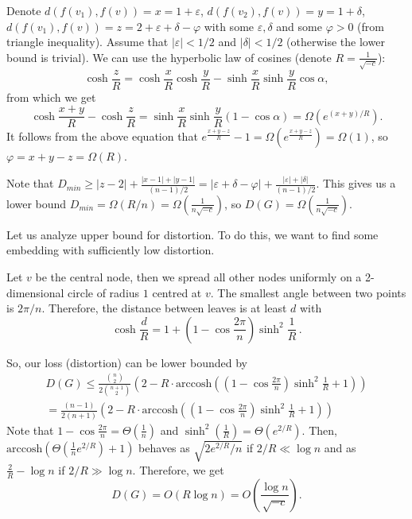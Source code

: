 \documentclass{article} %
\begin{document}
Denote $d(f(v_1),f(v)) = x = 1 + \varepsilon$, $d(f(v_2),f(v)) = y = 1 + \delta$, $d(f(v_1),f(v)) = z = 2 + \varepsilon + \delta - \varphi$ with some $\varepsilon, \delta$ and some $\varphi > 0$ (from triangle inequality). Assume that $|\varepsilon| < 1/2$ and $|\delta| < 1/2$ (otherwise the lower bound is trivial). We can use the hyperbolic law of cosines (denote $R = \frac{1}{\sqrt{-c}}$):
\[
\cosh \frac{z}{R} = \cosh \frac{x}{R} \cosh \frac{y}{R} - \sinh \frac{x}{R} \sinh \frac{y}{R} \cos \alpha,
\]
from which we get 
\[
\cosh \frac{x+y}{R} - \cosh \frac{z}{R} = \sinh \frac{x}{R} \sinh \frac{y}{R} (1 - \cos \alpha) = \Omega\left(e^{(x+y)/R}\right).
\]
It follows from the above equation that 
$e^{\frac{x+y-z}{R}} - 1 = \Omega\left(e^{\frac{x+y-z}{R}}\right) = \Omega(1)$, so $\varphi = x + y - z = \Omega(R)$.

Note that $D_{min} \ge |z-2| + \frac{|x-1| + |y-1|}{(n-1)/2} =  |\varepsilon + \delta - \varphi| + \frac{|\varepsilon| + |\delta|}{(n-1)/2}$. This gives us a lower bound $D_{min} = \Omega(R/n) = \Omega\left(\frac{1}{n\sqrt{-c}}\right)$, so $D(G) =  \Omega\left(\frac{1}{n\sqrt{-c}}\right)$.

Let us analyze upper bound for distortion. To do this, we want to find some embedding with sufficiently low distortion. 


Let $v$ be the central node, then we spread all other nodes uniformly on a 2-dimensional circle of radius $1$ centred at $v$. The smallest angle between two points is $2 \pi / n$. Therefore, the distance between leaves is at least $d$ with
\[
\cosh \frac{d}{R} = 1  + \left(1 -  \cos \frac{2 \pi}{n}\right)  \sinh^2 \frac{1}{R} \,.
\]


So, our loss (distortion) can be lower bounded by
\begin{multline*}
D(G) \le \frac{{n \choose 2}}{2{n+1\choose 2}} \left(2 - R\cdot \mathrm{arccosh}\left( \left(1 - \cos \frac{2 \pi}{n}\right)\sinh^2\frac{1}{R}  + 1 \right)\right) \\
= \frac{(n-1)}{2(n+1)} \left(2 - R\cdot \mathrm{arccosh}\left( \left(1 - \cos \frac{2 \pi}{n}\right)\sinh^2\frac{1}{R}  + 1 \right)\right)
\end{multline*}
Note that $1 - \cos\frac{2\pi}{n} = \Theta\left(\frac{1}{n}\right)$ and $\sinh^2\left(\frac{1}{R}\right) = \Theta\left(e^{2/R}\right)$.
Then, $\textrm{arccosh}\left(\Theta\left(\frac{1}{n} e^{2/R}\right) + 1 \right)$ behaves as $\sqrt{2e^{2/R}/n}$ if $2/R \ll \log n$ and as $\frac{2}{R} - \log n$ if $2/R \gg \log n$.
Therefore, we get
\[
D(G) = O\left( R \log n \right) = O\left( \frac{\log n}{\sqrt{-c}} \right).
\]
\end{document}
